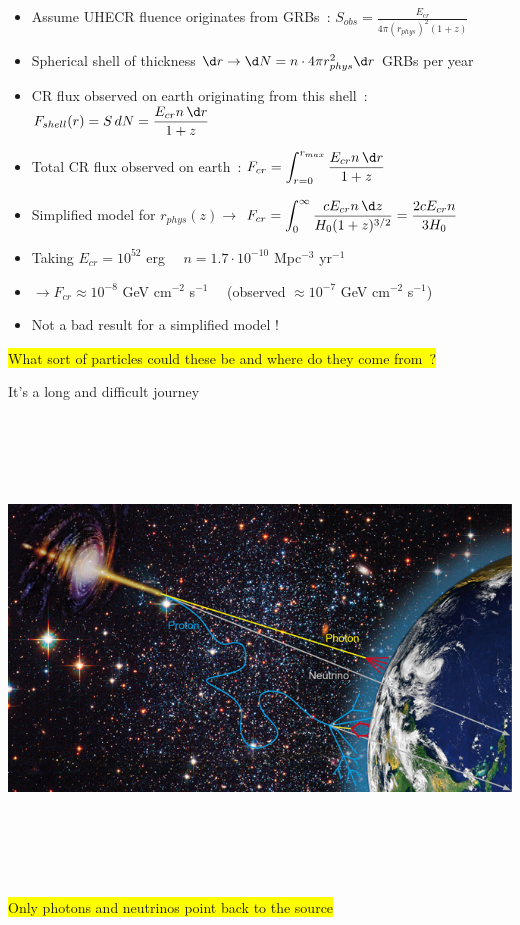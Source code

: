 \onecolumn

\begin{itemize}
\item Assume UHECR fluence originates from GRBs~:
      $\displaystyle S_{obs}=\frac{E_{cr}}{4\pi (r_{phys})^{2}(1+z)}$\\[1mm]
\item Spherical shell of thickness $\d r \rightarrow \d N=n \cdot 4\pi r_{phys}^{2} \d r$ GRBs per year
\item CR flux observed on earth originating from this shell~:
      $\displaystyle F_{shell}(r)=S\,dN=\frac{E_{cr}n\,\d r}{1+z}$
\item Total CR flux observed on earth~:
      $\displaystyle F_{cr}=\int_{r=0}^{r_{max}} \frac{E_{cr}n\,\d r}{1+z}$
\item Simplified model for $r_{phys}(z) \rightarrow$
      $\displaystyle F_{cr}=\int_{0}^{\infty} \frac{c E_{cr} n \, \d z}{H_{0}(1+z)^{3/2}}
       =\frac{2cE_{cr}n}{3H_{0}}$
\item Taking $E_{cr}=10^{52}$ erg $\quad n=1.7 \cdot 10^{-10}$ Mpc$^{-3}$ yr$^{-1}$
\item[] $\rightarrow F_{cr} \approx 10^{-8}$ GeV cm$^{-2}$ s$^{-1} \quad$
        (observed $\approx 10^{-7}$ GeV cm$^{-2}$ s$^{-1}$)
\item[] Not a bad result for a simplified model !
\end{itemize}

\begin{center}
\colorbox{yellow}{What sort of particles could these be and where do they come from~?}
\end{center}

\Tr
\onecolumn
\begin{center}
{\blue It's a long and difficult journey}\\[5mm]
\includegraphics[keepaspectratio,height=13cm]{app}\\[5mm]
\colorbox{yellow}{Only photons and neutrinos point back to the source}
\end{center}

\twocolumn
